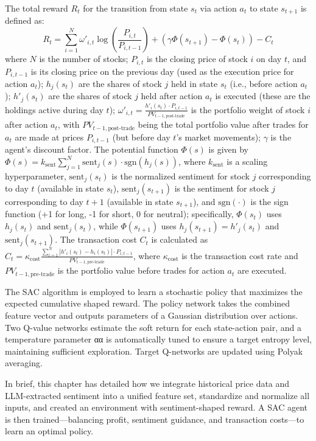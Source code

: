 The total reward \(R_t\) for the transition from state \(s_t\) via action \(a_t\) to state \(s_{t+1}\) is defined as:
\[R_t = \sum_{i=1}^{N} \omega'_{i,t} \log\left(\frac{P_{i,t}}{P_{i,t-1}}\right) + \left( \gamma \Phi(s_{t+1}) - \Phi(s_t) \right) - C_t\]
where \(N\) is the number of stocks; \(P_{i,t}\) is the closing price of stock \(i\) on day \(t\), and \(P_{i,t-1}\) is its closing price on the previous day (used as the execution price for action \(a_t\)); \(h_j(s_t)\) are the shares of stock \(j\) held in state \(s_t\) (i.e., before action \(a_t\)); \(h'_j(s_t)\) are the shares of stock \(j\) held after action \(a_t\) is executed (these are the holdings active during day \(t\)); \(\omega'_{i,t} = \frac{h'_{i}(s_t) \cdot P_{i,t-1}}{PV_{t-1,\text{post-trade}}}\) is the portfolio weight of stock \(i\) after action \(a_t\), with \(PV_{t-1,\text{post-trade}}\) being the total portfolio value after trades for \(a_t\) are made at prices \(P_{i,t-1}\) (but before day \(t\)'s market movements); \(\gamma\) is the agent's discount factor. The potential function \(\Phi(s)\) is given by \( \Phi(s) = k_{\text{sent}} \sum_{j=1}^{N} \text{sent}_j(s) \cdot \text{sgn}(h_j(s)) \), where \(k_{\text{sent}}\) is a scaling hyperparameter, \(\text{sent}_j(s_t)\) is the normalized sentiment for stock \(j\) corresponding to day \(t\) (available in state \(s_t\)), \(\text{sent}_j(s_{t+1})\) is the sentiment for stock \(j\) corresponding to day \(t+1\) (available in state \(s_{t+1}\)), and \(\text{sgn}(\cdot)\) is the sign function (+1 for long, -1 for short, 0 for neutral); specifically, \(\Phi(s_t)\) uses \(h_j(s_t)\) and \(\text{sent}_j(s_t)\), while \(\Phi(s_{t+1})\) uses \(h_j(s_{t+1}) = h'_j(s_t)\) and \(\text{sent}_j(s_{t+1})\). The transaction cost \(C_t\) is calculated as \( C_t = \kappa_{\text{cost}} \frac{\sum_{i=1}^{N} |h'_{i}(s_t) - h_i(s_t)| \cdot P_{i,t-1}}{PV_{t-1,\text{pre-trade}}} \), where \(\kappa_{\text{cost}}\) is the transaction cost rate and \(PV_{t-1,\text{pre-trade}}\) is the portfolio value before trades for action \(a_t\) are executed.

The \gls{SAC} algorithm is employed to learn a stochastic policy that maximizes the expected cumulative shaped reward. The policy network takes the combined feature vector and outputs parameters of a Gaussian distribution over actions. Two Q-value networks estimate the soft return for each state-action pair, and a temperature parameter αα is automatically tuned to ensure a target entropy level, maintaining sufficient exploration. Target Q-networks are updated using Polyak averaging.

In brief, this chapter has detailed how we integrate historical price data and \gls{LLM}-extracted sentiment into a unified feature set, standardize and normalize all inputs, and created an environment with sentiment-shaped reward. A \gls{SAC} agent is then trained—balancing profit, sentiment guidance, and transaction costs—to learn an optimal policy.
